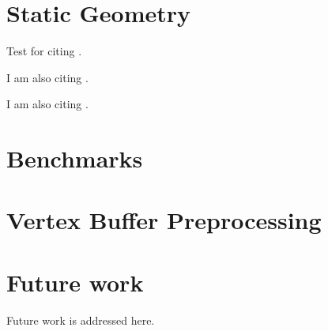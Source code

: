 \documentclass[]{article}
\renewcommand{\listoffigures}{\begingroup
\tocsection
\tocfile{\listfigurename}{lof}
\endgroup}
\begin{document}
\section{Static Geometry}
Test for citing \cite{amanatides1987fast}.

I am also citing \cite{ivson2009gpu}.

I am also citing \cite{reinhard2000dynamic}.

\section{Benchmarks}

\section{Vertex Buffer Preprocessing}

\section{Future work}
Future work is addressed here.

{}

%

\listoffigures
\end{document}
